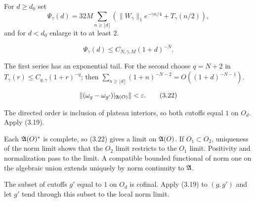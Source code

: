 \documentclass[11pt,a4paper]{article}
\begin{document}
\QedStep


For $d\geq d_0$ set
\[
 \Psi_\gamma(d)=32M\sum_{n\geq\lfloor d\rfloor}
 \left(\|W_\gamma\|_1e^{-\gamma n/4}+T_\gamma(n/2)\right),         \tag{3.20}
\]
and for $d<d_0$ enlarge it to at least $2$.

\[
 \Psi_\gamma(d)\leq C_{N,\gamma,M}(1+d)^{-N}.                     \tag{3.21}
\]

\Because The first series has an exponential tail.  For the second choose
$q=N+2$ in $T_\gamma(r)\leq C_{q,\gamma}(1+r)^{-q}$; then
$\sum_{n\geq\lfloor d\rfloor}(1+n)^{-N-2}=O((1+d)^{-N-1})$.

\QedStep



\[
 \|(\omega_g-\omega_{g'})|_{\mathfrak A(O)}\|<\varepsilon.                 \tag{3.22}
\]

\Because The directed order is inclusion of plateau interiors, so both cutoffs equal
$1$ on $O_d$.  Apply (3.19).


\Because Each $\mathfrak A(O)^*$ is complete, so (3.22) gives a limit on $\mathfrak A(O)$.  If
$O_1\subset O_2$, uniqueness of the norm limit shows that the $O_2$ limit restricts
to the $O_1$ limit.  Positivity and normalization pass to the limit.  A compatible
bounded functional of norm one on the algebraic union extends uniquely by norm
continuity to $\mathfrak A$.


\Because The subset of cutoffs $g'$ equal to $1$ on $O_d$ is cofinal.  Apply
(3.19) to $(g,g')$ and let $g'$ tend through this subset to the local norm limit.

\QedStep

\end{document}
